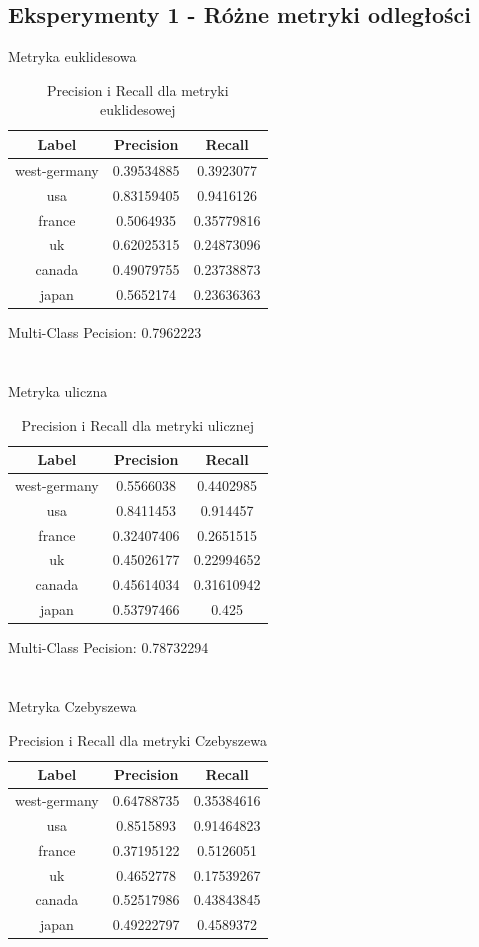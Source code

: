 \documentclass{classrep}
\begin{document}
\subsection{Eksperymenty 1 - Różne metryki odległości}
Metryka euklidesowa
\begin{table}[H]
\begin{tabular}{|c|c|c|}
\hline
Label        & Precision  & Recall     \\ \hline
west-germany & 0.39534885 & 0.3923077  \\ \hline
usa          & 0.83159405 & 0.9416126  \\ \hline
france       & 0.5064935  & 0.35779816 \\ \hline
uk           & 0.62025315 & 0.24873096 \\ \hline
canada       & 0.49079755 & 0.23738873 \\ \hline
japan        & 0.5652174  & 0.23636363 \\ \hline
\end{tabular}
\caption{Precision i Recall dla metryki euklidesowej}
\end{table}
Multi-Class Pecision: 0.7962223\\
\\
\\
Metryka uliczna
\begin{table}[H]
\begin{tabular}{|c|c|c|}
\hline
Label        & Precision  & Recall     \\ \hline
west-germany & 0.5566038  & 0.4402985  \\ \hline
usa          & 0.8411453  & 0.914457   \\ \hline
france       & 0.32407406 & 0.2651515  \\ \hline
uk           & 0.45026177 & 0.22994652 \\ \hline
canada       & 0.45614034 & 0.31610942 \\ \hline
japan        & 0.53797466 & 0.425      \\ \hline
\end{tabular}
\caption{Precision i Recall dla metryki ulicznej}
\end{table}
Multi-Class Pecision: 0.78732294\\
\\
\\
Metryka Czebyszewa
\begin{table}[H]
\begin{tabular}{|c|c|c|}
\hline
Label        & Precision  & Recall     \\ \hline
west-germany & 0.64788735 & 0.35384616 \\ \hline
usa          & 0.8515893  & 0.91464823 \\ \hline
france       & 0.37195122 & 0.5126051  \\ \hline
uk           & 0.4652778  & 0.17539267 \\ \hline
canada       & 0.52517986 & 0.43843845 \\ \hline
japan        & 0.49222797 & 0.4589372  \\ \hline
\end{tabular}
\caption{Precision i Recall dla metryki Czebyszewa}
\end{table}
\end{document}
